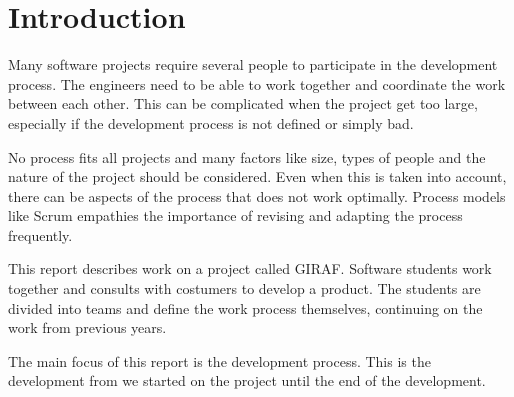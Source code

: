 \section{Introduction}

Many software projects require several people to participate in the development process. The engineers need to be able to work together and coordinate the work between each other. This can be complicated when the project get too large, especially if the development process is not defined or simply bad.

No process fits all projects and many factors like size, types of people and the nature of the project should be considered. Even when this is taken into account, there can be aspects of the process that does not work optimally. Process models like \gls{Scrum} empathies the importance of revising and adapting the process frequently\cite{Scrum}.

This report describes work on a project called GIRAF. Software students work together and consults with costumers to develop a product. The students are divided into teams and define the work process themselves, continuing on the work from previous years. 

The main focus of this report is the development process. This is the development from we started on the project until the end of the development. 